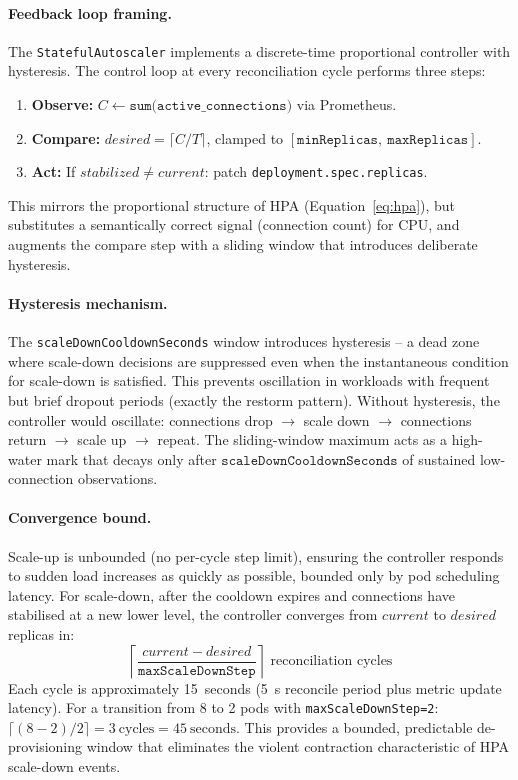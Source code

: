 \documentclass[twocolumn]{svjour3}
\begin{document}
\paragraph{Feedback loop framing.}
The \texttt{StatefulAutoscaler} implements a discrete-time proportional controller with hysteresis. The control loop at every reconciliation cycle performs three steps:
\begin{enumerate}[leftmargin=*]
\item \textbf{Observe:} $C \gets \texttt{sum(active\_connections)}$ via Prometheus.
\item \textbf{Compare:} $desired = \lceil C / T \rceil$, clamped to $[\texttt{minReplicas},\ \texttt{maxReplicas}]$.
\item \textbf{Act:} If $stabilized \neq current$: patch \texttt{deployment.spec.replicas}.
\end{enumerate}
This mirrors the proportional structure of HPA (Equation~\ref{eq:hpa}), but substitutes a semantically correct signal (connection count) for CPU, and augments the compare step with a sliding window that introduces deliberate hysteresis.

\paragraph{Hysteresis mechanism.}
The \texttt{scaleDownCooldownSeconds} window introduces hysteresis -- a dead zone where scale-down decisions are suppressed even when the instantaneous condition for scale-down is satisfied. This prevents oscillation in workloads with frequent but brief dropout periods (exactly the restorm pattern). Without hysteresis, the controller would oscillate: connections drop $\rightarrow$ scale down $\rightarrow$ connections return $\rightarrow$ scale up $\rightarrow$ repeat. The sliding-window maximum acts as a high-water mark that decays only after $\texttt{scaleDownCooldownSeconds}$ of sustained low-connection observations.

\paragraph{Convergence bound.}
Scale-up is unbounded (no per-cycle step limit), ensuring the controller responds to sudden load increases as quickly as possible, bounded only by pod scheduling latency. For scale-down, after the cooldown expires and connections have stabilised at a new lower level, the controller converges from $current$ to $desired$ replicas in:
\begin{equation}
\left\lceil \frac{current - desired}{\texttt{maxScaleDownStep}} \right\rceil \text{ reconciliation cycles}
\label{eq:convergence}
\end{equation}
Each cycle is approximately 15~seconds (5~s reconcile period plus metric update latency). For a transition from 8 to 2 pods with \texttt{maxScaleDownStep=2}: $\lceil (8-2)/2 \rceil = 3\ \text{cycles} = 45\ \text{seconds}$. This provides a bounded, predictable de-provisioning window that eliminates the violent contraction characteristic of HPA scale-down events.
\end{document}
